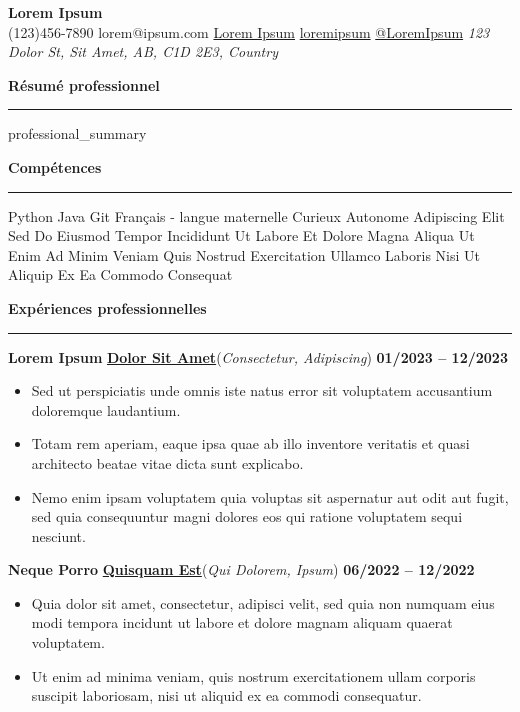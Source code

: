 \documentclass[letterpaper]{article}
\makeatletter
\newcommand\MyHeadings[4]{%
  \noindent \textbf{#1} \hfill\textbf{\underline{#2}}(\textit{#3}) \hfill \textbf{#4}
\par
}
\newcommand{\myname}{Lorem Ipsum}
\newcommand{\contactinfo}{\faPhone{} (123)456-7890 \textbar{} \faEnvelope{} lorem@ipsum.com \textbar{} \faLinkedin{} \href{https://linkedin.com/in/loremipsum}{Lorem Ipsum} \textbar{} \faGithub{} \href{https://github.com/loremipsum}{loremipsum} \textbar{} \faYoutubePlay{} \href{https://youtube.com/@LoremIpsum}{@LoremIpsum} \textit{123 Dolor St, Sit Amet, AB, C1D 2E3, Country}}
\newcommand{\header}{
    \begin{center}
    \Huge\textbf{\myname} \\
    \small\contactinfo \\
    \end{center}
}
\newcommand{\sectionheader}[1]{
    \vspace{8pt}
    \noindent\textbf{\large #1}
    \vspace{4pt}
    \hrule
    \vspace{6pt}
}
\makeatother
\begin{document}
\header

\sectionheader{Résumé professionnel}

{{professional_summary}}

\sectionheader{Compétences}
\noindent Python \textbar{} Java \textbar{} Git \textbar{} Français - langue maternelle \textbar{} Curieux \textbar{} Autonome \textbar{} Adipiscing \textbar{} Elit \textbar{} Sed \textbar{} Do \textbar{} Eiusmod \textbar{} Tempor \textbar{} Incididunt \textbar{} Ut \textbar{} Labore \textbar{} Et \textbar{} Dolore \textbar{} Magna \textbar{} Aliqua \textbar{} Ut \textbar{} Enim \textbar{} Ad \textbar{} Minim \textbar{} Veniam \textbar{} Quis \textbar{} Nostrud \textbar{} Exercitation \textbar{} Ullamco \textbar{} Laboris \textbar{} Nisi \textbar{} Ut \textbar{} Aliquip \textbar{} Ex \textbar{} Ea \textbar{} Commodo \textbar{} Consequat

\sectionheader{Expériences professionnelles}

\MyHeadings{Lorem Ipsum}{Dolor Sit Amet}{Consectetur, Adipiscing}{01/2023 -- 12/2023}

\begin{itemize}
    \item Sed ut perspiciatis unde omnis iste natus error sit voluptatem accusantium doloremque laudantium.
    \item Totam rem aperiam, eaque ipsa quae ab illo inventore veritatis et quasi architecto beatae vitae dicta sunt explicabo.
    \item Nemo enim ipsam voluptatem quia voluptas sit aspernatur aut odit aut fugit, sed quia consequuntur magni dolores eos qui ratione voluptatem sequi nesciunt.
\end{itemize}

\vspace{6pt}

\MyHeadings{Neque Porro}{Quisquam Est}{Qui Dolorem, Ipsum}{06/2022 -- 12/2022}
\begin{itemize}
    \item Quia dolor sit amet, consectetur, adipisci velit, sed quia non numquam eius modi tempora incidunt ut labore et dolore magnam aliquam quaerat voluptatem.
    \item Ut enim ad minima veniam, quis nostrum exercitationem ullam corporis suscipit laboriosam, nisi ut aliquid ex ea commodi consequatur.
\end{itemize}

\vspace{6pt}
\end{document}
